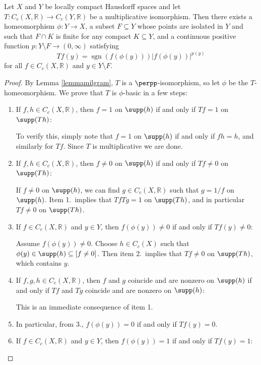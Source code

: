 \begin{theorem}
Let $X$ and $Y$ be locally compact Hausdorff spaces and let $T:C_c(X,\mathbb{R})\to C_c(Y,\mathbb{R})$ be a multiplicative isomorphism. Then there exists a homeomorphism $\phi:Y\to X$, a subset $F\subseteq Y$ whose points are isolated in $Y$ and such that $F\cap K$ is finite for any compact $K\subseteq Y$, and a continuous positive function $p:Y\setminus F\to(0,\infty)$ satisfying
\[Tf(y)=\operatorname{sgn}(f(\phi(y)))|f(\phi (y))|^{p(y)}\]
for all $f\in C_c(X,\mathbb{R})$ and $y\in Y\setminus F$.
\end{theorem}
\begin{proof}
By Lemma \ref{lemmamilgram}, $T$ is a $\perpp$-isomorphism, so let $\phi$ be the $T$-homeomorphism. We prove that $T$ is $\phi$-basic in a few steps:
\begin{enumerate}
\item If $f,h\in C_c(X,\mathbb{R})$, then $f=1$ on $\supp(h)$ if and only if $Tf=1$ on $\supp(Th)$:

To verify this, simply note that $f=1$ on $\supp(h)$ if and only if $fh=h$, and similarly for $Tf$. Since $T$ is multiplicative we are done.

\item If $f,h\in C_c(X,\mathbb{R})$, then $f\neq 0$ on $\supp(h)$ if and only if $Tf\neq 0$ on $\supp(Th)$:

If $f\neq 0$ on $\supp(h)$, we can find $g\in C_c(X,\mathbb{R})$ such that $g=1/f$ on $\supp(h)$. Item 1.\ implies that $TfTg=1$ on $\supp(Th)$, and in particular $Tf\neq 0$ on $\supp(Th)$.

\item If $f\in C_c(X,\mathbb{R})$ and $y\in Y$, then $f(\phi(y))\neq 0$ if and only if $Tf(y)\neq 0$:

Assume $f(\phi(y))\neq 0$. Choose $h\in C_c(X)$ such that $\phi(y)\in\supp(h)\subseteq[f\neq 0]$. Then item 2.\ implies that $Tf\neq 0$ on $\supp(Th)$, which contains $y$.

\item If $f,g,h\in C_c(X,\mathbb{R})$, then $f$ and $g$ coincide and are nonzero on $\supp(h)$ if and only if $Tf$ and $Tg$ coincide and are nonzero on $\supp(h)$:

This is an immediate consequence of item 1.%
\item In particular, from 3., $f(\phi(y))=0$ if and only if $Tf(y)=0$.
\item If $f\in C_c(X,\mathbb{R})$ and $y\in Y$, then $f(\phi(y))=1$ if and only if $Tf(y)=1$:


\end{enumerate}
\end{proof}
